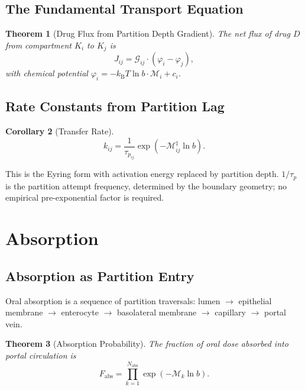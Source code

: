 \documentclass[twocolumn,10pt,a4paper]{article}
\newtheorem{theorem}{Theorem}[section]
\newtheorem{corollary}[theorem]{Corollary}
\theoremstyle{definition}
\theoremstyle{remark}
\newcommand{\kB}{k_{\mathrm{B}}}
\newcommand{\Depth}{\mathcal{M}}
\newcommand{\Gcond}{\mathcal{G}}
\newcommand{\taup}{\tau_p}
\begin{document}
\subsection{The Fundamental Transport Equation}

\begin{theorem}[Drug Flux from Partition Depth Gradient]
\label{thm:flux}
The net flux of drug $D$ from compartment $K_i$ to $K_j$ is
\begin{equation}
    J_{ij} = \Gcond_{ij}\cdot (\varphi_i - \varphi_j),
    \label{eq:flux}
\end{equation}
with chemical potential $\varphi_i = -\kB T\ln b\cdot\Depth_i + c_i$.
\end{theorem}

\subsection{Rate Constants from Partition Lag}

\begin{corollary}[Transfer Rate]
\begin{equation}
    k_{ij} = \frac{1}{\taup_{ij}}\exp(-\Depth^\ddagger_{ij}\ln b).
    \label{eq:rate}
\end{equation}
\end{corollary}

This is the Eyring form with activation energy replaced by partition depth. $1/\taup$ is the partition attempt frequency, determined by the boundary geometry; no empirical pre-exponential factor is required.

\section{Absorption}

\subsection{Absorption as Partition Entry}

Oral absorption is a sequence of partition traversals: lumen $\to$ epithelial membrane $\to$ enterocyte $\to$ basolateral membrane $\to$ capillary $\to$ portal vein.

\begin{theorem}[Absorption Probability]
\label{thm:absprob}
The fraction of oral dose absorbed into portal circulation is
\begin{equation}
    F_{\mathrm{abs}} = \prod_{k=1}^{N_{\mathrm{abs}}}\exp(-\Depth_k\ln b).
    \label{eq:Fabs}
\end{equation}
\end{theorem}
\end{document}
